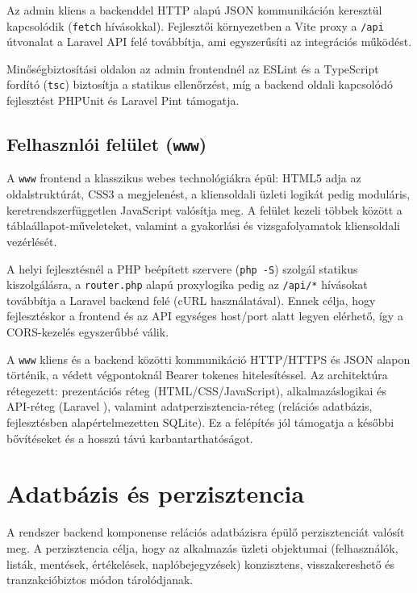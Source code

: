 \documentclass{thesis-ekf}
\begin{document}
Az admin kliens a backenddel HTTP alapú JSON kommunikáción keresztül kapcsolódik (\texttt{fetch} hívásokkal). Fejlesztői környezetben a Vite proxy a \texttt{/api} útvonalat a Laravel API felé továbbítja, ami egyszerűsíti az integrációs működést.

Minőségbiztosítási oldalon az admin frontendnél az ESLint \cite{eslint-docs} és a TypeScript fordító (\texttt{tsc}) \cite{typescript-docs} biztosítja a statikus ellenőrzést, míg a backend oldali kapcsolódó fejlesztést PHPUnit és Laravel Pint támogatja.

\subsection{Felhasznlói felület (\texttt{www})}
A \texttt{www} frontend a klasszikus webes technológiákra épül: HTML5 \cite{html5-spec} adja az oldalstruktúrát, CSS3 \cite{css3-roadmap} a megjelenést, a kliensoldali üzleti logikát pedig moduláris, keretrendszerfüggetlen JavaScript valósítja meg. A felület kezeli többek között a táblaállapot-műveleteket, valamint a gyakorlási és vizsgafolyamatok kliensoldali vezérlését.

A helyi fejlesztésnél a PHP beépített szervere \cite{php-docs} (\texttt{php -S}) szolgál statikus kiszolgálásra, a \texttt{router.php} alapú proxylogika pedig az \texttt{/api/*} hívásokat továbbítja a Laravel backend felé (cURL \cite{curl-docs} használatával). Ennek célja, hogy fejlesztéskor a frontend és az API egységes host/port alatt legyen elérhető, így a CORS-kezelés egyszerűbbé válik.

A \texttt{www} kliens és a backend közötti kommunikáció HTTP/HTTPS és JSON \cite{json-org} alapon történik, a védett végpontoknál Bearer tokenes hitelesítéssel. Az architektúra rétegezett: prezentációs réteg (HTML/CSS/JavaScript), alkalmazáslogikai és API-réteg (Laravel \cite{laravel}), valamint adatperzisztencia-réteg (relációs adatbázis, fejlesztésben alapértelmezetten SQLite). Ez a felépítés jól támogatja a későbbi bővítéseket és a hosszú távú karbantarthatóságot.

\section{Adatbázis és perzisztencia}
A rendszer backend komponense relációs adatbázisra épülő perzisztenciát valósít meg. A perzisztencia célja, hogy az alkalmazás üzleti objektumai (felhasználók, listák, mentések, értékelések, naplóbejegyzések) konzisztens, visszakereshető és tranzakcióbiztos módon tárolódjanak.
\end{document}
